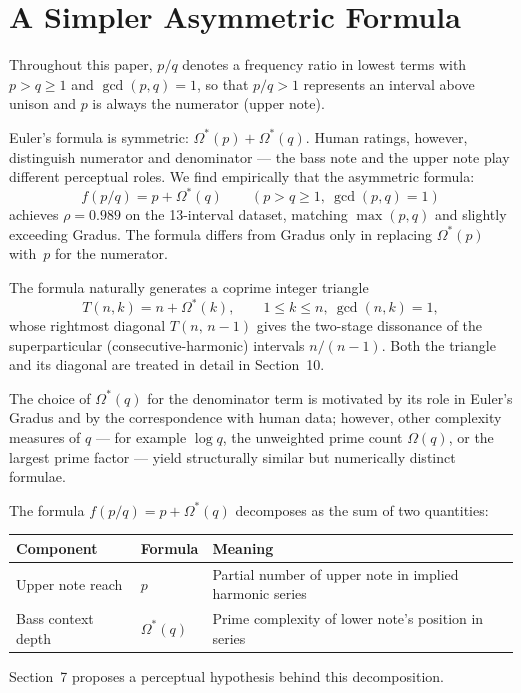 \documentclass[11pt,a4paper]{article}
\newcommand{\Os}{\Omega^{\!*}}
\begin{document}
\section{A Simpler Asymmetric Formula}

Throughout this paper, $p/q$ denotes a frequency ratio in lowest terms with
$p > q \geq 1$ and $\gcd(p,q) = 1$, so that $p/q > 1$ represents an
interval above unison and $p$ is always the numerator (upper note).

Euler's formula is symmetric: $\Os(p) + \Os(q)$. Human ratings, however,
distinguish numerator and denominator --- the bass note and the upper note
play different perceptual roles. We find empirically that the asymmetric
formula:
\[
  \boxed{f(p/q) = p + \Os(q)} \qquad (p > q \geq 1,\ \gcd(p,q)=1)
\]
achieves $\rho = 0.989$ on the 13-interval dataset, matching $\max(p,q)$ and
slightly exceeding Gradus. The formula differs from Gradus only in replacing
$\Os(p)$ with~$p$ for the numerator.

The formula naturally generates a coprime integer triangle
\[
  T(n,k) = n + \Os(k), \qquad 1 \leq k \leq n,\ \gcd(n,k) = 1,
\]
whose rightmost diagonal $T(n,\,n-1)$ gives the two-stage dissonance of the
superparticular (consecutive-harmonic) intervals $n/(n-1)$. Both the triangle
and its diagonal are treated in detail in Section~10.

The choice of $\Os(q)$ for the denominator term is motivated by its role in
Euler's Gradus and by the correspondence with human data; however, other
complexity measures of $q$ --- for example $\log q$, the unweighted prime
count $\Omega(q)$, or the largest prime factor --- yield structurally similar
but numerically distinct formulae.

\medskip
\noindent The formula $f(p/q) = p + \Os(q)$ decomposes as the sum of two
quantities:

\medskip
\begin{tabular}{lll}
\toprule
Component & Formula & Meaning \\
\midrule
Upper note reach & $p$ & Partial number of upper note in implied harmonic series \\
Bass context depth & $\Os(q)$ & Prime complexity of lower note's position in series \\
\bottomrule
\end{tabular}

\medskip\noindent
Section~7 proposes a perceptual hypothesis behind this decomposition.

\end{document}
